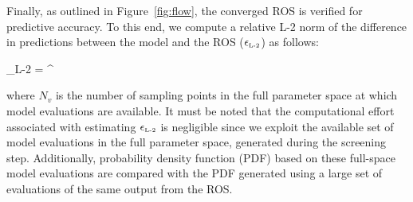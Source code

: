 Finally, as outlined in Figure~\ref{fig:flow}, the converged ROS is verified for predictive accuracy. 
To this end, we compute a relative L-2 norm of the difference in predictions between the model
and the ROS ($\epsilon_{\mbox{\tiny{L-2}}}$) as follows:

\be
\epsilon_{\mbox{\tiny{L-2}}} = 
{\left[\sum\limits_{i=1}^{N_v}\left(G(\bm{\theta}_i)\right)^2\right]^{}}
\label{eq:l2}
\ee

\noindent where $N_v$ is the number of sampling points in the full parameter space at which model
evaluations are available. It must be noted that the computational effort associated with estimating
 $\epsilon_{\mbox{\tiny{L-2}}}$
is negligible since we exploit the available set of model evaluations in the full parameter space, generated
during the screening step. Additionally, probability density function (PDF) based on these full-space 
model evaluations are compared with the PDF generated using a large set of evaluations of the same
output from the ROS. 


 
